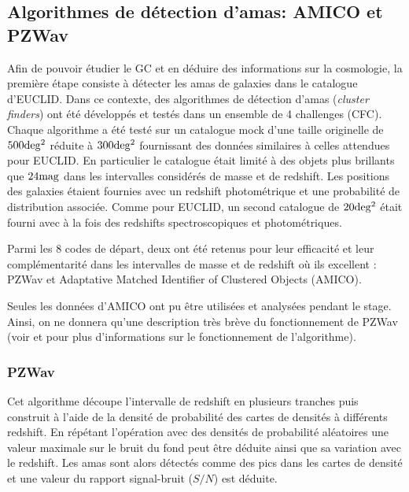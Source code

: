 \documentclass[a4paper,11pt]{article}
\numberwithin{equation}{section}
\begin{document}
  \subsection{Algorithmes de détection d'amas: AMICO et PZWav}
    Afin de pouvoir étudier le GC et en déduire des informations sur la cosmologie, la première étape consiste à détecter les amas de galaxies dans le catalogue d'EUCLID. Dans ce contexte, des algorithmes de détection d'amas (\textit{cluster finders}) ont été développés et testés dans un ensemble de 4 challenges (CFC).\newline
    Chaque algorithme a été testé sur un catalogue mock\cite{Catalog_EUCLID} d'une taille originelle de $500 \rm{deg^2}$ réduite à $300 \rm{deg^2}$ fournissant des données similaires à celles attendues pour EUCLID. En particulier le catalogue était limité à des objets plus brillants que $24 \rm{mag}$ dans les intervalles considérés de masse et de redshift. Les positions des galaxies étaient fournies avec un redshift photométrique et une probabilité de distribution associée. Comme pour EUCLID, un second catalogue de $20 \rm{deg^2}$ était fourni avec à la fois des redshifts spectroscopiques et photométriques.\par
    Parmi les 8 codes de départ, deux ont été retenus pour leur efficacité et leur complémentarité dans les intervalles de masse et de redshift où ils excellent : PZWav et Adaptative Matched Identifier of Clustered Objects (AMICO).\par

    Seules les données d'AMICO ont pu être utilisées et analysées pendant le stage. Ainsi, on ne donnera qu'une description très brève du fonctionnement de PZWav (voir \cite{EUCLID} et \cite{IRAC} pour plus d'informations sur le fonctionnement de l'algorithme).
    \subsubsection{PZWav}
      Cet algorithme découpe l'intervalle de redshift en plusieurs tranches puis construit à l'aide de la densité de probabilité des cartes de densités à différents redshift. En répétant l'opération avec des densités de probabilité aléatoires une valeur maximale sur le bruit du fond peut être déduite ainsi que sa variation avec le redshift. Les amas sont alors détectés comme des pics dans les cartes de densité et une valeur du rapport signal-bruit ($S/N$) est déduite.
\end{document}
